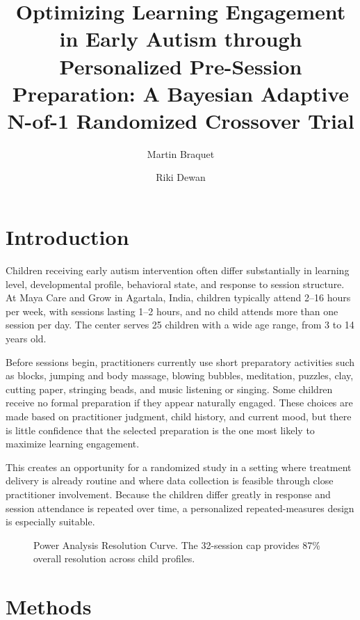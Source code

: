 \documentclass[9pt,a4paper,twocolumn,twoside]{rho-class/rho}
\title{Optimizing Learning Engagement in Early Autism through Personalized Pre-Session Preparation: A Bayesian Adaptive N-of-1 Randomized Crossover Trial}
\author[{\textasteriskcentered},\textdagger,a]{Martin Braquet}
\author[{\textdagger},b]{Riki Dewan}
\affil[a]{Affiliation of author one}
\affil[b]{Affiliation of author two}
\begin{document}
	
	\maketitle
	\thispagestyle{firststyle}
	
	
	\section{Introduction}
	
	
	Children receiving early autism intervention often differ substantially in learning level, developmental profile, behavioral state, and response to session structure. At Maya Care and Grow in Agartala, India, children typically attend 2–16 hours per week, with sessions lasting 1–2 hours, and no child attends more than one session per day. The center serves 25 children with a wide age range, from 3 to 14 years old.
	
	Before sessions begin, practitioners currently use short preparatory activities such as blocks, jumping and body massage, blowing bubbles, meditation, puzzles, clay, cutting paper, stringing beads, and music listening or singing. Some children receive no formal preparation if they appear naturally engaged. These choices are made based on practitioner judgment, child history, and current mood, but there is little confidence that the selected preparation is the one most likely to maximize learning engagement.
	
	This creates an opportunity for a randomized study in a setting where treatment delivery is already routine and where data collection is feasible through close practitioner involvement. Because the children differ greatly in response and session attendance is repeated over time, a personalized repeated-measures design is especially suitable.
	
	\begin{figure}[t]
		\centering
		\resizebox{\textwidth}{!}{
			
		}
		\caption{Power Analysis Resolution Curve. The 32-session cap provides 87\% overall resolution across child profiles.}
		\label{fig:01_power_analysis}
	\end{figure}



	\section{Methods}
\end{document}
